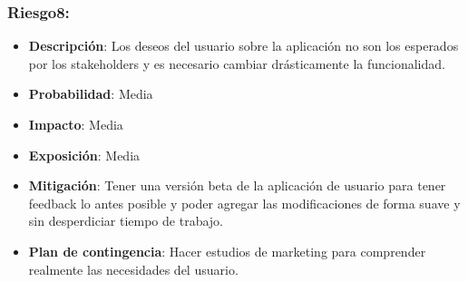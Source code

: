 \subsubsection{Riesgo8:}

\begin{itemize}
\itemsep1pt\parskip0pt
\item
  \textbf{Descripción}: Los deseos del usuario sobre la aplicación no
  son los esperados por los stakeholders y es necesario cambiar
  drásticamente la funcionalidad.
\item
  \textbf{Probabilidad}: Media
\item
  \textbf{Impacto}: Media
\item
  \textbf{Exposición}: Media
\item
  \textbf{Mitigación}: Tener una versión beta de la aplicación de
  usuario para tener feedback lo antes posible y poder agregar las
  modificaciones de forma suave y sin desperdiciar tiempo de trabajo.
\item
  \textbf{Plan de contingencia}: Hacer estudios de marketing para
  comprender realmente las necesidades del usuario.
\end{itemize}

